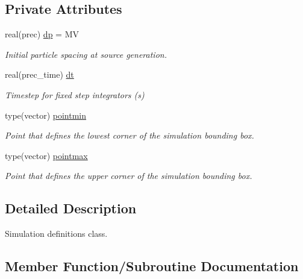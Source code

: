 \subsection*{Private Attributes}
\begin{DoxyCompactItemize}
\item 
real(prec) \mbox{\hyperlink{structsimulation__globals_1_1simdefs__t_a416b838aca82edb2df262f5f503a00ae}{dp}} = MV
\begin{DoxyCompactList}\small\item\em Initial particle spacing at source generation. \end{DoxyCompactList}\item 
real(prec\+\_\+time) \mbox{\hyperlink{structsimulation__globals_1_1simdefs__t_a4fc7292599841fe5a63e66e5577d49d2}{dt}}
\begin{DoxyCompactList}\small\item\em Timestep for fixed step integrators (s) \end{DoxyCompactList}\item 
type(vector) \mbox{\hyperlink{structsimulation__globals_1_1simdefs__t_a76b66c4e9d305de6a0c3b8f1bd2ef319}{pointmin}}
\begin{DoxyCompactList}\small\item\em Point that defines the lowest corner of the simulation bounding box. \end{DoxyCompactList}\item 
type(vector) \mbox{\hyperlink{structsimulation__globals_1_1simdefs__t_a8c7a365078a69252312ea200c619bcb6}{pointmax}}
\begin{DoxyCompactList}\small\item\em Point that defines the upper corner of the simulation bounding box. \end{DoxyCompactList}\end{DoxyCompactItemize}


\subsection{Detailed Description}
Simulation definitions class. 

\subsection{Member Function/\+Subroutine Documentation}
\mbox{\label{structsimulation__globals_1_1simdefs__t_aade8e069ae929a97a9c78cc52d1078f7}} 
